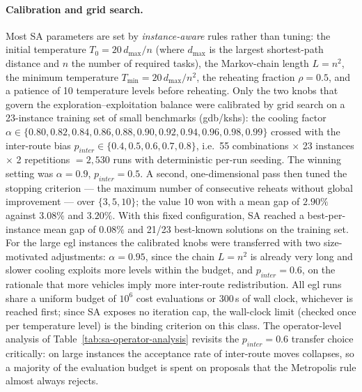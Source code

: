 \paragraph{Calibration and grid search.}
Most SA parameters are set by \emph{instance-aware} rules rather than
tuning: the initial temperature $T_0 = 20\, d_{\max}/n$ (where $d_{\max}$ is
the largest shortest-path distance and $n$ the number of required tasks),
the Markov-chain length $L = n^2$, the minimum temperature
$T_{\min} = 20\, d_{\max}/n^2$, the reheating fraction $\rho = 0.5$, and a
patience of
10 temperature levels before reheating. Only the two knobs that govern the
exploration--exploitation balance were calibrated by grid search on a
23-instance training set of small benchmarks (gdb/kshs): the cooling factor
$\alpha \in \{0.80, 0.82, 0.84, 0.86, 0.88, 0.90, 0.92, 0.94, 0.96, 0.98,
0.99\}$ crossed with the inter-route bias $p_{inter} \in \{0.4, 0.5, 0.6,
0.7, 0.8\}$, i.e.\ 55 combinations $\times$ 23 instances $\times$ 2
repetitions $= 2{,}530$ runs with deterministic per-run seeding. The winning
setting was $\alpha = 0.9$, $p_{inter} = 0.5$. A second, one-dimensional
pass then tuned the stopping criterion --- the maximum number of consecutive
reheats without global improvement --- over $\{3, 5, 10\}$; the value 10 won
with a mean gap of $2.90\%$ against $3.08\%$ and $3.20\%$. With this fixed
configuration, SA reached a best-per-instance mean gap of $0.08\%$ and 21/23
best-known solutions on the training set. For the large egl instances the
calibrated knobs were transferred with two size-motivated adjustments:
$\alpha = 0.95$, since the chain $L = n^2$ is already very long and slower
cooling exploits more levels within the budget, and $p_{inter} = 0.6$, on
the rationale that more vehicles imply more inter-route redistribution. All
egl runs share a uniform budget of $10^6$ cost evaluations or 300\,s of wall
clock, whichever is reached first; since SA exposes no iteration cap, the
wall-clock limit (checked once per temperature level) is the binding
criterion on this class. The operator-level analysis of
Table~\ref{tab:sa-operator-analysis} revisits the $p_{inter} = 0.6$ transfer
choice critically: on large instances the acceptance rate of inter-route
moves collapses, so a majority of the evaluation budget is spent on
proposals that the Metropolis rule almost always rejects.
